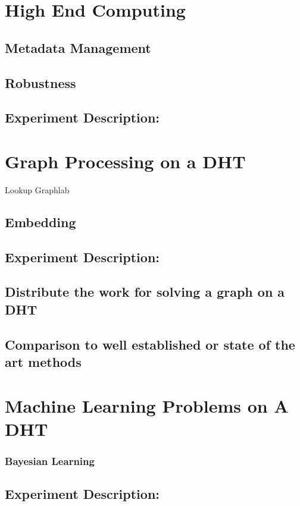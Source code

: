 \documentclass[10pt,letterpaper]{report}
\begin{document}
\section{High End Computing}
\subsection{Metadata Management}
\subsection{Robustness}

\subsection{Experiment Description:}

\section{Graph Processing on a DHT}
Lookup Graphlab
\subsection{Embedding}

\subsection{Experiment Description:}
\subsection{Distribute the work for solving a graph on a DHT}
\subsection{Comparison to well established or state of the art methods}



\section{Machine Learning Problems on A DHT}
\subsubsection{Bayesian Learning}
\subsection{Experiment Description:}
\end{document}

